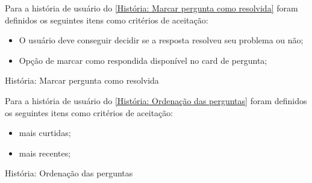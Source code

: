Para a história de usuário do \autoref{História: Marcar pergunta como resolvida} foram definidos os seguintes itens como critérios de aceitação:

\begin{itemize}
\item O usuário deve conseguir decidir se a resposta resolveu seu problema ou não;
\item Opção de marcar como respondida disponível no card de pergunta; 
\end{itemize}

\def\arraystretch{2}
\begin{quadro}[htb]
\centering
\ABNTEXfontereduzida
\caption[História: Marcar pergunta como resolvida]{História: Marcar pergunta como resolvida}
\label{História: Marcar pergunta como resolvida}
\end{quadro}
\FloatBarrier 

Para a história de usuário do \autoref{História: Ordenação das perguntas} foram definidos os seguintes itens como critérios de aceitação:

\begin{itemize}
\item mais curtidas;
\item mais recentes;
\end{itemize}

\def\arraystretch{2}
\begin{quadro}[htb]
\centering
\ABNTEXfontereduzida
\caption[História: Ordenação das perguntas]{História: Ordenação das perguntas}
\label{História: Ordenação das perguntas}
\end{quadro}
\FloatBarrier 

